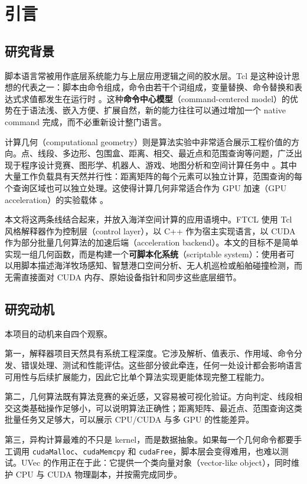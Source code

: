 ﻿\chapter{引言}

\section{研究背景}
脚本语言常被用作底层系统能力与上层应用逻辑之间的胶水层。Tcl 是这种设计思想的代表之一：脚本由命令组成，命令由若干个词组成，变量替换、命令替换和表达式求值都发生在运行时 \cite{ousterhout1994tcl,tcldocs}。这种\textbf{命令中心模型}（command-centered model）的优势在于语法浅、嵌入方便、扩展自然，新的能力往往可以通过增加一个 native command 完成，而不必重新设计整门语言。

计算几何（computational geometry）则是算法实验中非常适合展示工程价值的方向。点、线段、多边形、包围盒、距离、相交、最近点和范围查询等问题，广泛出现于程序设计竞赛、图形学、机器人、游戏、地图分析和空间计算任务中 \cite{deberg2008computational,preparata1985computational}。其中大量工作负载具有天然并行性：距离矩阵的每个元素可以独立计算，范围查询的每个查询区域也可以独立处理。这使得计算几何非常适合作为 GPU 加速（GPU acceleration）的\mbox{实验}载体 \cite{cuda-guide}。

本文将这两条线结合起来，并放入海洋空间计算的应用语境中。FTCL 使用 Tcl 风格解释器作为控制层（control layer），以 C++ 作为宿主实现语言，以 CUDA 作为部分批量几何算法的加速后端（acceleration backend）。本文的目标不是简单实现一组几何函数，而是构建一个\textbf{可脚本化系统}（scriptable system）：使用者可以用脚本描述海洋牧场感知、智慧港口空间分析、无人机巡检或船舶碰撞检测，而无需直接面对 CUDA 内存、原始设备指针和同步这些底层细节。

\section{研究动机}
本项目的动机来自四个观察。

第一，解释器项目天然具有系统工程深度。它涉及解析、值表示、作用域、命令分发、错误处理、测试和性能评估。这些部分彼此牵连，任何一处设计都会影响语言可用性与后续扩展能力，因此它比单个算法实现更能体现完整工程能力。

第二，几何算法既有算法竞赛的亲近感，又容易被可视化\mbox{验证}。方向判定、线段相交这类基础操作足够小，可以说明算法正确性；距离矩阵、最近点、范围查询这类批量任务又足够大，可以展示 CPU/CUDA 与多 GPU 的性能差异。

第三，异构计算最难的不只是 kernel，而是数据抽象。如果每一个几何命令都要手工调用 \texttt{cudaMalloc}、\texttt{cudaMemcpy} 和 \texttt{cudaFree}，脚本层会变得难用，也难以测试。UVec 的作用正在于此：它提供一个类向量对象（vector-like object），同时维护 CPU 与 CUDA 物理副本，并按需完成同步。

